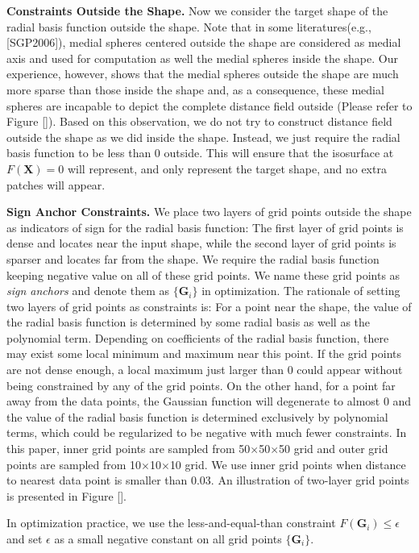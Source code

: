 \documentclass[annual]{acmsiggraph}
\begin{document}
\textbf{Constraints Outside the Shape. }
Now we consider the target shape of the radial basis function outside the shape. Note that in some literatures(e.g., [SGP2006]), medial spheres centered outside the shape are considered as medial axis and used for computation as well the medial spheres inside the shape. Our experience, however, shows that the medial spheres outside the shape are much more sparse than those inside the shape and, as a consequence, these medial spheres are incapable to depict the complete distance field outside (Please refer to Figure []). Based on this observation, we do not try to construct distance field outside the shape as we did inside the shape. Instead, we just require the radial basis function to be less than 0 outside. This will ensure that the isosurface at $F(\mathbf{X})=0$ will represent, and only represent the target shape, and no extra patches will appear. 

\textbf{Sign Anchor Constraints. }
We place two layers of grid points outside the shape as indicators of sign for the radial basis function: The first layer of grid points is dense and locates near the input shape, while the second layer of grid points is sparser and locates far from the shape. We require the radial basis function keeping negative value on all of these grid points. We name these grid points as \textit{sign anchors} and denote them as $\{\mathbf{G}_i\}$ in optimization. The rationale of setting two layers of grid points as constraints is: For a point near the shape, the value of the radial basis function is determined by some radial basis as well as the polynomial term. Depending on coefficients of the radial basis function, there may exist some local minimum and maximum near this point. If the grid points are not dense enough, a local maximum just larger than 0 could appear without being constrained by any of the grid points. On the other hand, for a point far away from the data points, the Gaussian function will degenerate to almost 0 and the value of the radial basis function is determined exclusively by polynomial terms, which could be regularized to be negative with much fewer constraints. In this paper, inner grid points are sampled from 50$\times$50$\times$50 grid and outer grid points are sampled from 10$\times$10$\times$10 grid. We use inner grid points when distance to nearest data point is smaller than 0.03. An illustration of two-layer grid points is presented in Figure [].

In optimization practice, we use the less-and-equal-than constraint $F(\mathbf{G}_i)\le\epsilon$ and set $\epsilon$ as a small negative constant on all grid points $\{\mathbf{G}_i\}$.
\end{document}

